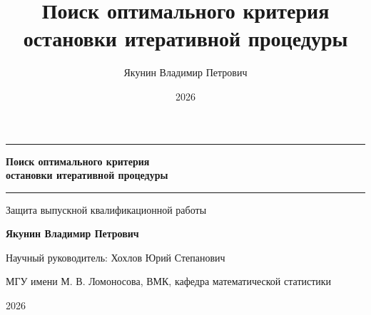 \documentclass[aspectratio=169,11pt]{beamer}
\title{Поиск оптимального критерия остановки итеративной процедуры}
\author{Якунин Владимир Петрович}
\date{2026}
\begin{document}


\begin{frame}[plain]
\centering
\vspace{1mm}
{\color{msuBlue}\rule{0.80\paperwidth}{0.7pt}}\par
\vspace{5mm}
{\color{msuBlue}\bfseries\fontsize{21}{25}\selectfont Поиск оптимального критерия\\[1mm] остановки
итеративной процедуры}\par
\vspace{4mm}
{\color{msuBlue}\rule{16mm}{1.0pt}}\par
\vspace{4mm}
{\large Защита выпускной квалификационной работы}\par
\vspace{6mm}
{\normalsize\bfseries Якунин Владимир Петрович}\par
\vspace{1.5mm}
{\normalsize Научный руководитель: Хохлов Юрий Степанович}\par
\vspace{5mm}
{\small МГУ имени М. В. Ломоносова, ВМК, кафедра математической статистики}\par
\vfill
{\normalsize 2026}\par
\vspace{1mm}
\end{frame}
\end{document}
